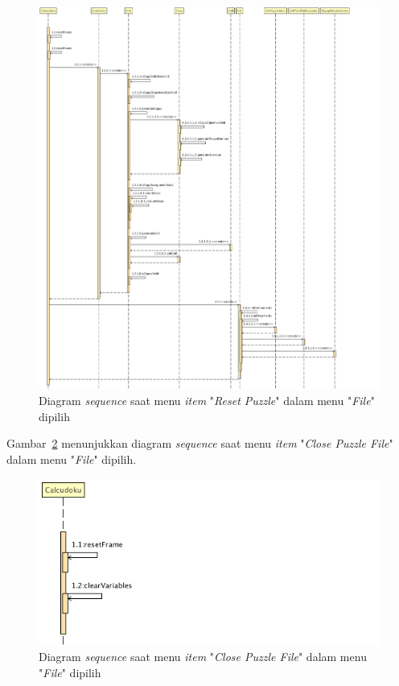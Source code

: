 \begin{figure}
\centering
\captionsetup{justification=centering}
\includegraphics[scale=0.4]{Gambar/Analisis/SequenceDiagramReset.png}
\caption[Diagram \textit{sequence} saat menu \textit{item} "\textit{Reset Puzzle}" dalam menu "\textit{File}" dipilih]{Diagram \textit{sequence} saat menu \textit{item} "\textit{Reset Puzzle}" dalam menu "\textit{File}" dipilih}
\label{fig:sequencereset}
\end{figure}

\clearpage

Gambar~\ref{fig:sequenceclose} menunjukkan diagram \textit{sequence} saat menu \textit{item} "\textit{Close Puzzle File}" dalam menu "\textit{File}" dipilih.

\begin{figure}
\centering
\captionsetup{justification=centering}
\includegraphics[scale=0.5]{Gambar/Analisis/SequenceDiagramClose.png}
\caption[Diagram \textit{sequence} saat menu \textit{item} "\textit{Close Puzzle File}" dalam menu "\textit{File}" dipilih]{Diagram \textit{sequence} saat menu \textit{item} "\textit{Close Puzzle File}" dalam menu "\textit{File}" dipilih}
\label{fig:sequenceclose}
\end{figure}

